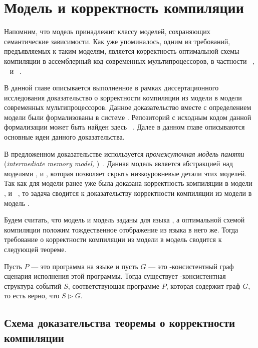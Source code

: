 \chapter{Модель \Wkm и корректность компиляции}
\label{ch:weakestmo-imm}

Напомним, что модель \Wkm принадлежит классу моделей,
сохраняющих семантические зависимости.
Как уже упоминалось, одним из требований, предъявляемых к таким моделям,
является корректность оптимальной схемы компиляции
в ассемблерный код современных мультипроцессоров,
в частности \Intel~\cite{Sewell-al:CACM10},
\ARM~\cite{Pulte-al:POPL18} и \POWER~\cite{Alglave-al:TOPLAS14}.

В данной главе описывается выполненное в рамках
диссертационного исследования доказательство
о корректности компиляции из модели \Wkm в модели
современных мультипроцессоров.
Данное доказательство вместе с определением модели \Wkm
были формализованы в системе \coq.
Репозиторий с исходным кодом данной формализации
может быть найден здесь~%
\cite{Coq:Weakestmo}.
Далее в данном главе описываются основные идеи данного доказательства.

В предложенном доказательстве используется \emph{промежуточная модель памяти}
(\emph{intermediate memory model, \IMM})~\cite{Podkopaev-al:POPL19}.
Данная модель является абстракцией над моделями \Intel, \ARM и \POWER,
которая позволяет скрыть низкоуровневые детали этих моделей.
Так как для модели \IMM ранее уже была доказана
корректность компиляции в модели \Intel, \ARM и \POWER~\cite{Podkopaev-al:POPL19}, 
то задача сводится к доказательству корректности компиляции из модели \Wkm в модель \IMM. 

Будем считать, что модель \Wkm и модель \IMM заданы для языка \LLANG,
а оптимальной схемой компиляции положим
тождественное отображение из языка \LLANG в него же.
Тогда требование о корректности компиляции
из модели \Wkm в модель \IMM сводится к следующей теореме. 

\begin{theorem}
  \label{thm:main}
  Пусть $P$ --- это программа на языке \LLANG
  и пусть $G$ --- это \IMM-консистентный граф сценария исполнения этой программы.
  Тогда существует \Wkm-консистентная структура событий $S$,
  соответствующая программе $P$, которая содержит граф $G$, 
  то есть верно, что $S \rhd G$.
\end{theorem}


\section{Схема доказательства теоремы о корректности компиляции}

